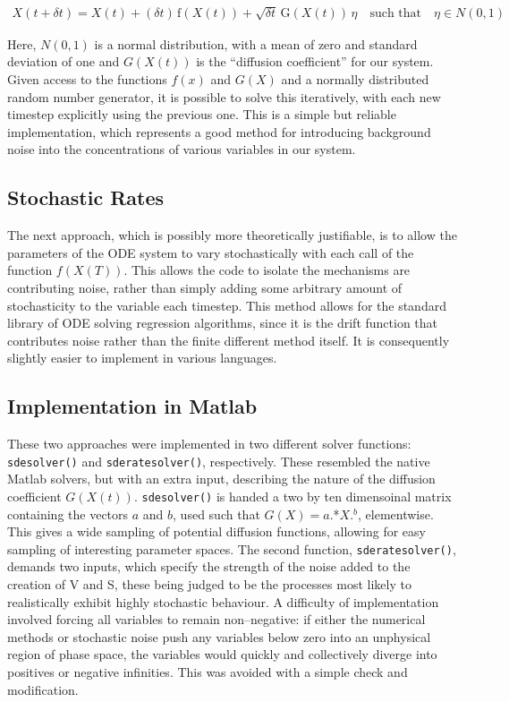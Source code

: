 \documentclass[a4paper, 12pt]{report}
\begin{document}
\begin{align}
X(t+\delta t) = X(t) + (\delta t)\, \mathrm f (X(t)) + \sqrt{ \delta t}\, \mathrm G (X(t))\, \eta \quad \text{such that} \quad \eta \in N(0,1)
\end{align}

Here, $N(0,1)$ is a normal distribution, with a mean of zero and standard deviation of one and $G(X(t))$ is the ``diffusion coefficient'' for our system. Given access to the functions $f(x)$ and $G(X)$ and a normally distributed random number generator, it is possible to solve this iteratively, with each new timestep explicitly using the previous one. This is a simple but reliable implementation, which represents a good method for introducing background noise into the concentrations of various variables in our system.

\subsection{Stochastic Rates}

The next approach, which is possibly more theoretically justifiable, is to allow the parameters of the ODE system to vary stochastically with each call of the function $f(X(T))$. This allows the code to isolate the mechanisms are contributing noise, rather than simply adding some arbitrary amount of stochasticity to the variable each timestep. This method allows for the standard library of ODE solving regression algorithms, since it is the drift function that contributes noise rather than the finite different method itself. It is consequently slightly easier to implement in various languages.

\subsection{Implementation in Matlab}

These two approaches were implemented in two different solver functions: \texttt{sdesolver()} and \texttt{sderatesolver()}, respectively. These resembled the native Matlab solvers, but with an extra input, describing the nature of the diffusion coefficient $G(X(t))$. \texttt{sdesolver()} is handed a two by ten dimensoinal matrix containing the vectors $a$ and $b$, used such that $G(X)=a.$*$X.^b$, elementwise. This gives a wide sampling of potential diffusion functions, allowing for easy sampling of interesting parameter spaces. The second function, \texttt{sderatesolver()}, demands two inputs, which specify the strength of the noise added to the creation of V and S, these being judged to be the processes most likely to realistically exhibit highly stochastic behaviour. A difficulty of implementation involved forcing all variables to remain non--negative: if either the numerical methods or stochastic noise push any variables below zero into an unphysical region of phase space, the variables would quickly and collectively diverge into positives or negative infinities. This was avoided with a simple check and modification.
\end{document}
